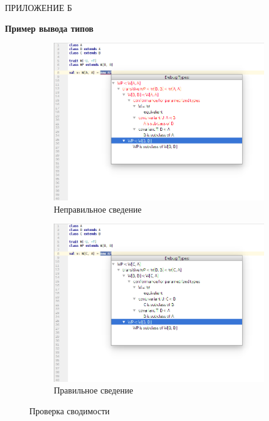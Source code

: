 \vfill
\clearpage
\newpage


\vfill
\clearpage
\appendix

\hfill ПРИЛОЖЕНИЕ Б
\begin{center}
  \textbf{Пример вывода типов}
\end{center}
\markboth{\MakeUppercase{}}{}

\begin{figure}[h!]
  \centering
  \begin{subfigure}{\linewidth}
    \centering
    \includegraphics[width=.8\linewidth]{img/conformance1}
    \caption{Неправильное сведение}
  \end{subfigure}

  \begin{subfigure}{\linewidth}
    \centering
    \includegraphics[width=.8\linewidth]{img/conformance2}
    \caption{Правильное сведение}
  \end{subfigure}
  \caption{Проверка сводимости}
  \label{fig:infer}
\end{figure}


